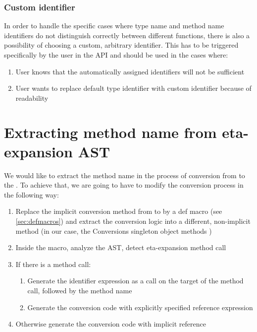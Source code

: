 \subsubsection{Custom identifier}
\label{subsubsec:custom_identifier}

In order to handle the specific cases where type name and method name identifiers do not distinguish correctly between different functions, there is also a possibility of choosing a custom, arbitrary identifier. This has to be triggered specifically by the user in the API and should be used in the cases where:

\begin{enumerate}
	\item User knows that the automatically assigned identifiers will not be sufficient
	\item User wants to replace default type identifier with custom identifier because of readability
\end{enumerate}

\section{Extracting method name from eta-expansion AST}

We would like to extract the method name in the process of conversion from  to the . To achieve that, we are going to have to modify the conversion process in the following way:

\begin{enumerate}
	\item Replace the implicit conversion method from  to  by a def macro (see \ref{sec:defmacros}) and extract the conversion logic into a different, non-implicit method (in our case, the Conversions singleton object methods )
	\item Inside the macro, analyze the AST, detect eta-expansion method call
	\item If there is a method call:
	\begin{enumerate}
		\item Generate the identifier expression as a  call on the target of the method call, followed by the method name
		\item Generate the conversion code with explicitly specified reference expression
	\end{enumerate}
	\item Otherwise generate the conversion code with implicit reference	
\end{enumerate}

